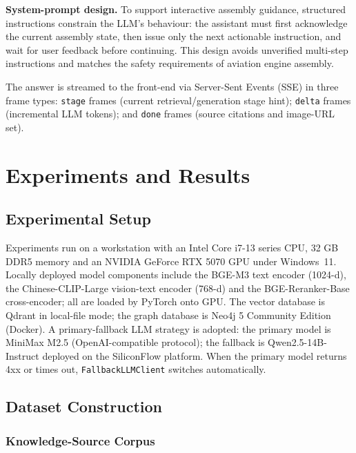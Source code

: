 \documentclass[applsci,article,submit,pdftex,moreauthors]{Definitions/mdpi}
\begin{document}
\textbf{System-prompt design.} To support interactive assembly guidance, structured instructions constrain the LLM's behaviour: the assistant must first acknowledge the current assembly state, then issue only the next actionable instruction, and wait for user feedback before continuing. This design avoids unverified multi-step instructions and matches the safety requirements of aviation engine assembly.

The answer is streamed to the front-end via Server-Sent Events (SSE) in three frame types: \texttt{stage} frames (current retrieval/generation stage hint); \texttt{delta} frames (incremental LLM tokens); and \texttt{done} frames (source citations and image-URL set).

\section{Experiments and Results}
\label{sec:experiment}

\subsection{Experimental Setup}
\label{sec:exp-setup}

Experiments run on a workstation with an Intel Core i7-13 series CPU, 32 GB DDR5 memory and an NVIDIA GeForce RTX 5070 GPU under Windows~11. Locally deployed model components include the BGE-M3 text encoder (1024-d), the Chinese-CLIP-Large vision-text encoder (768-d) and the BGE-Reranker-Base cross-encoder; all are loaded by PyTorch onto GPU. The vector database is Qdrant in local-file mode; the graph database is Neo4j 5 Community Edition (Docker). A primary-fallback LLM strategy is adopted: the primary model is MiniMax M2.5 (OpenAI-compatible protocol); the fallback is Qwen2.5-14B-Instruct deployed on the SiliconFlow platform. When the primary model returns 4xx or times out, \texttt{FallbackLLMClient} switches automatically.

\subsection{Dataset Construction}
\label{sec:exp-dataset}

\subsubsection{Knowledge-Source Corpus}
\end{document}
